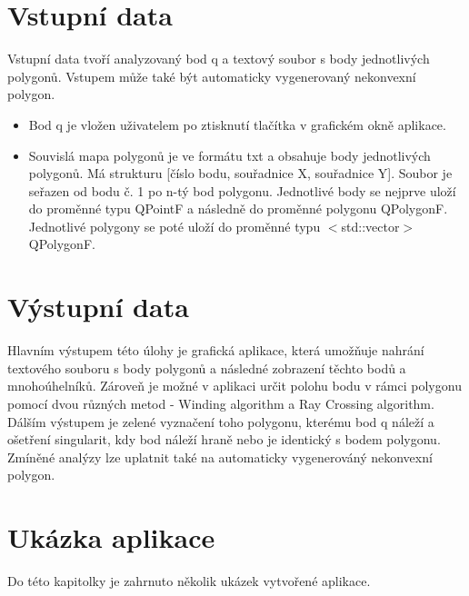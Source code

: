 \documentclass[a4paper,11pt,twoside]{article}
\begin{document}
\vspace*{-1cm}
\section{Vstupní data}
Vstupní data tvoří analyzovaný bod q a textový soubor s body jednotlivých polygonů. Vstupem může také být automaticky vygenerovaný nekonvexní polygon.
\begin{itemize}
\item Bod q je vložen uživatelem po ztisknutí tlačítka v grafickém okně aplikace.
\item Souvislá mapa polygonů je ve formátu txt a obsahuje body jednotlivých polygonů. Má strukturu
[číslo bodu, souřadnice X, souřadnice Y]. Soubor je seřazen od bodu č. 1 po n-tý bod polygonu. Jednotlivé body se nejprve uloží do proměnné typu QPointF a následně do proměnné polygonu QPolygonF. Jednotlivé polygony se poté uloží do proměnné typu $<$std::vector$>$QPolygonF.
\end{itemize}

\section{Výstupní data}
Hlavním výstupem této úlohy je grafická aplikace, která umožňuje nahrání textového souboru s body polygonů a následné zobrazení těchto bodů a mnohoúhelníků. Zároveň je možné v aplikaci určit polohu bodu v rámci polygonu pomocí dvou různých metod - Winding algorithm a Ray Crossing algorithm. Dálším výstupem je zelené vyznačení toho polygonu, kterému bod q náleží a ošetření singularit, kdy bod náleží hraně nebo je identický s bodem polygonu. Zmíněné analýzy lze uplatnit také na automaticky vygenerováný nekonvexní polygon.
\\

\newpage
{}

\vspace*{-1cm}
\section{Ukázka aplikace}
\noindent
\large
Do této kapitolky je zahrnuto několik ukázek vytvořené aplikace.
\end{document}
